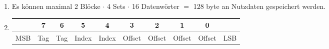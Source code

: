 \documentclass[a4paper, 12pt, margins=2cm]{homework}
\begin{document}
\begin{problem}
  
\end{problem}
\begin{solution}\hfill
  \begin{enumerate}[label=(\alph*)]\itemsep0pt
    \item Es können maximal 2 Blöcke $\cdot$ 4 Sets $\cdot$ 16 Datenwörter $=$ 128 byte
          an Nutzdaten gespeichert werden.

    \item \hfill\begin{center}
            \begin{tabular}{c|c|c|c|c|c|c|c|c|c}
                  & 7   & 6   & 5     & 4     & 3      & 2      & 1      & 0      &     \\ \hline
              MSB & Tag & Tag & Index & Index & Offset & Offset & Offset & Offset & LSB \\ \hline
            \end{tabular}
          \end{center}


\end{enumerate}
\end{solution}
\end{document}

